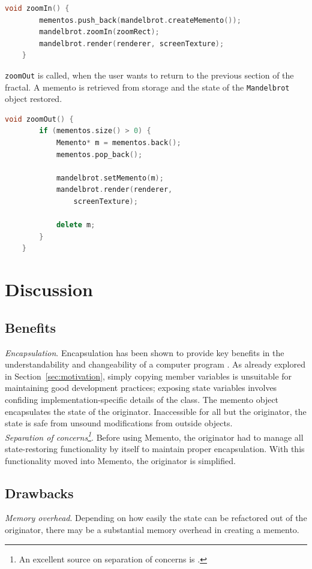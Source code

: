 \documentclass[11pt, a4paper, twoside]{article}
\begin{document}
	\begin{lstlisting}[language=c++, caption={Main.cpp}]
	void zoomIn() {
		mementos.push_back(mandelbrot.createMemento());
		mandelbrot.zoomIn(zoomRect);
		mandelbrot.render(renderer, screenTexture);
	}
	\end{lstlisting}
	
	\verb|zoomOut| is called, when the user wants to return to the previous section of the fractal. A memento is retrieved from storage and the state of the \verb|Mandelbrot| object restored.
	
	\begin{lstlisting}[language=c++, caption={Main.cpp}]
	void zoomOut() {
		if (mementos.size() > 0) {
			Memento* m = mementos.back();
			mementos.pop_back();
			
			mandelbrot.setMemento(m);
			mandelbrot.render(renderer,
				screenTexture);
			
			delete m;
		}
	}
	\end{lstlisting}
	
	\section{Discussion}
	
	\subsection{Benefits}
	\label{sec:benefits}
	\emph{Encapsulation}. Encapsulation has been shown to provide key benefits in the understandability and changeability of a computer program \cite{snyder1986}. As already explored in Section~\ref{sec:motivation}, simply copying member variables is unsuitable for maintaining good development practices; exposing state variables involves confiding implementation-specific details of the class. The memento object encapsulates the state of the originator. Inaccessible for all but the originator, the state is safe from unsound modifications from outside objects. \\
	
	\noindent\emph{Separation of concerns\footnote{An excellent source on separation of concerns is \cite{Huersch95}.}}. Before using Memento, the originator had to manage all state-restoring functionality by itself to maintain proper encapsulation. With this functionality moved into Memento, the originator is simplified.
	
	\subsection{Drawbacks}
	\emph{Memory overhead}. Depending on how easily the state can be refactored out of the originator, there may be a substantial memory overhead in creating a memento. \\
	
\end{document}
